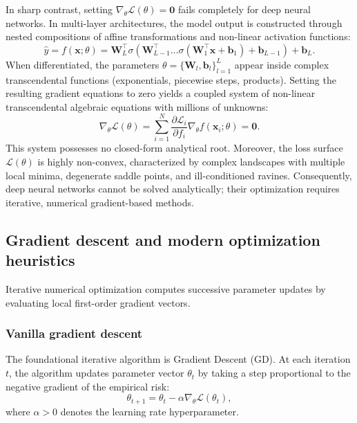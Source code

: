 \documentclass[../../../main.tex]{subfiles}
\begin{document}
In sharp contrast, setting $\nabla_\theta \mathcal{L}(\theta) = \mathbf{0}$ fails completely for deep neural networks. In multi-layer architectures, the model output is constructed through nested compositions of affine transformations and non-linear activation functions:
\begin{equation}
\hat{y} = f(\mathbf{x}; \theta) = \mathbf{W}_L^\top \sigma\left( \mathbf{W}_{L-1}^\top \dots \sigma\left( \mathbf{W}_1^\top \mathbf{x} + \mathbf{b}_1 \right) + \mathbf{b}_{L-1} \right) + \mathbf{b}_L.
\end{equation}
When differentiated, the parameters $\theta = \{\mathbf{W}_l, \mathbf{b}_l\}_{l=1}^L$ appear inside complex transcendental functions (exponentials, piecewise steps, products). Setting the resulting gradient equations to zero yields a coupled system of non-linear transcendental algebraic equations with millions of unknowns:
\begin{equation}
\nabla_\theta \mathcal{L}(\theta) = \sum_{i=1}^N \frac{\partial \mathcal{L}_i}{\partial f_i} \nabla_\theta f(\mathbf{x}_i; \theta) = \mathbf{0}.
\end{equation}
This system possesses no closed-form analytical root. Moreover, the loss surface $\mathcal{L}(\theta)$ is highly non-convex, characterized by complex landscapes with multiple local minima, degenerate saddle points, and ill-conditioned ravines. Consequently, deep neural networks cannot be solved analytically; their optimization requires iterative, numerical gradient-based methods.

\subsection{Gradient descent and modern optimization heuristics}
\label{subsec:gradient_descent_heuristics}

Iterative numerical optimization computes successive parameter updates by evaluating local first-order gradient vectors.

\subsubsection{Vanilla gradient descent}

The foundational iterative algorithm is Gradient Descent (GD). At each iteration $t$, the algorithm updates parameter vector $\theta_t$ by taking a step proportional to the negative gradient of the empirical risk:
\begin{equation}
\theta_{t+1} = \theta_t - \alpha \nabla_\theta \mathcal{L}(\theta_t),
\end{equation}
where $\alpha > 0$ denotes the learning rate hyperparameter.
\end{document}
